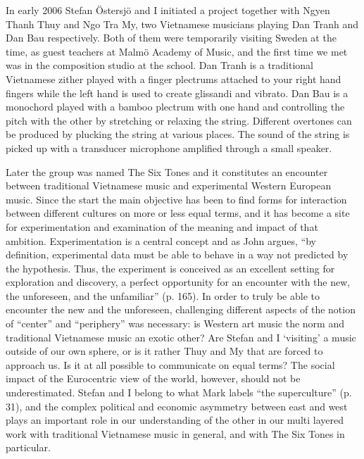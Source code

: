 \documentclass[a4paper]{article}
\begin{document}
In early 2006 Stefan Östersjö and I initiated a project together with Ngyen Thanh Thuy and Ngo Tra My, two Vietnamese musicians playing Dan Tranh and Dan Bau respectively. Both of them were temporarily visiting Sweden at the time, as guest teachers at Malmö Academy of Music, and the first time we met was in the composition studio at the school. Dan Tranh is a traditional Vietnamese zither played with a finger plectrums attached to your right hand fingers while the left hand is used to create glissandi and vibrato. Dan Bau is a monochord played with a bamboo plectrum with one hand and controlling the pitch with the other by stretching or relaxing the string. Different overtones can be produced by plucking the string at various places. The sound of the string is picked up with a transducer microphone amplified through a small speaker.

Later the group was named The Six Tones and it constitutes an encounter between traditional Vietnamese music and experimental Western European music. Since the start the main objective has been to find forms for interaction between different cultures on more or less equal terms, and it has become a site for experimentation and examination of the meaning and impact of that ambition. Experimentation is a central concept and as John \citet{corbett2000} argues, ``by definition, experimental data must be able to behave in a way not predicted by the hypothesis. Thus, the experiment is conceived as an excellent setting for exploration and discovery, a perfect opportunity for an encounter with the new, the unforeseen, and the unfamiliar'' (p. 165). In order to truly be able to encounter the new and the unforeseen, challenging different aspects of the notion of ``center'' and ``periphery'' was necessary: is Western art music the norm and traditional Vietnamese music an exotic other? Are Stefan and I `visiting' a music outside of our own sphere, or is it rather Thuy and My that are forced to approach us. Is it at all possible to communicate on equal terms? The social impact of the Eurocentric view of the world, however, should not be underestimated. Stefan and I belong to what Mark \citet{slobin1987} labels ``the superculture'' (p. 31), and the complex political and economic asymmetry between east and west plays an important role in our understanding of the other in our multi layered work with traditional Vietnamese music in general, and with The Six Tones in particular.
\end{document}
